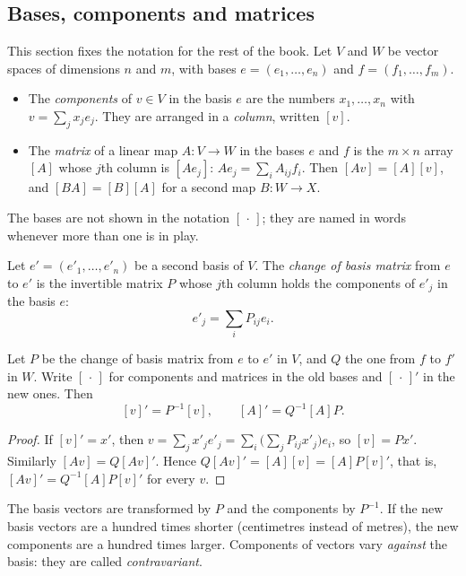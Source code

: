 \begin{notechapter}
\section{Bases, components and matrices}\label{duality:sec:matrices}

This section fixes the notation for the rest of the book. Let $V$ and $W$
be vector spaces of dimensions $n$ and $m$, with bases
$e = (e_1,\dots,e_n)$ and $f = (f_1,\dots,f_m)$.

\begin{itemize}[nosep]
  \item The \emph{components} of $v\in V$ in the basis $e$ are the numbers
        $x_1,\dots,x_n$ with $v = \sum_jx_je_j$. They are arranged in a
        \emph{column}, written $[v]$.
  \item The \emph{matrix} of a linear map $A:V\to W$ in the bases $e$ and
        $f$ is the $m\times n$ array $[A]$ whose $j$th column is
        $[Ae_j]$: $Ae_j = \sum_iA_{ij}f_i$. Then $[Av] = [A][v]$, and
        $[BA] = [B][A]$ for a second map $B:W\to X$.
\end{itemize}
The bases are not shown in the notation $[\,\cdot\,]$; they are named in
words whenever more than one is in play.

\begin{definition}\label{duality:def:change}
Let $e' = (e'_1,\dots,e'_n)$ be a second basis of $V$. The \emph{change of
basis matrix} from $e$ to $e'$ is the invertible matrix $P$ whose $j$th
column holds the components of $e'_j$ in the basis $e$:
\[
  e'_j = \sum_iP_{ij}e_i .
\]
\end{definition}

\begin{proposition}
\label{duality:prop:vector-change}
Let $P$ be the change of basis matrix from $e$ to $e'$ in $V$, and $Q$
the one from $f$ to $f'$ in $W$. Write $[\,\cdot\,]$ for components and
matrices in the old bases and $[\,\cdot\,]'$ in the new ones. Then
\[
  [v]' = P^{-1}[v],
  \qquad
  [A]' = Q^{-1}[A]P .
\]
\end{proposition}

\begin{proof}
If $[v]' = x'$, then
$v = \sum_jx'_je'_j = \sum_i\bigl(\sum_jP_{ij}x'_j\bigr)e_i$,
so $[v] = Px'$. Similarly $[Av] = Q[Av]'$. Hence
$Q[Av]' = [A][v] = [A]P[v]'$, that is, $[Av]' = Q^{-1}[A]P[v]'$ for every
$v$.
\end{proof}

\begin{intuition}
The basis vectors are transformed by $P$ and the components by $P^{-1}$.
If the new basis vectors are a hundred times shorter (centimetres instead
of metres), the new components are a hundred times larger. Components of
vectors vary \emph{against} the basis: they are called
\emph{contravariant}.
\end{intuition}


\end{notechapter}
